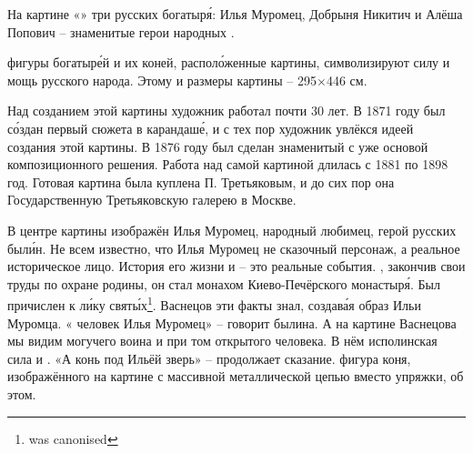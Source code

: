На картине «»  три русских богатыр\'{я}: Илья Муромец, Добрыня Никитич и Алёша Попович -- знаменитые герои народных .

 фигуры богатыр\'{е}й и их коней, распол\'{о}женные  картины, символизируют силу и мощь русского народа. Этому   и  размеры картины -- 295$\times$446 см.

Над созданием этой картины художник работал почти 30 лет. В 1871 году был с\'{о}здан первый  сюжета в карандаш\'{е}, и с тех пор художник увлёкся идеей создания этой картины. В 1876 году был сделан знаменитый  с уже  основой композиционного решения. Работа над самой картиной длилась с 1881 по 1898 год. Готовая картина была куплена П. Третьяковым, и до сих пор она  Государственную Третьяковскую галерею в Москве.

В центре картины изображён Илья Муромец, народный любимец, герой русских был\'{и}н. Не всем известно, что Илья Муромец не сказочный персонаж, а реальное историческое лицо. История его жизни и   -- это реальные события. , закончив свои труды по охране родины, он стал монахом Киево-Печёрского монастыр\'{я}. Был причислен к л\'{и}ку свят\'{ы}х\footnote{was canonised}. Васнецов эти факты знал, создав\'{а}я образ Ильи Муромца. « человек Илья Муромец» -- говорит былина. А на картине Васнецова мы видим могучего воина и при том  открытого человека. В нём  исполинская сила и . «А конь под Ильёй  зверь» -- продолжает сказание.  фигура коня, изображённого на картине с массивной металлической цепью вместо упряжки,  об этом.

